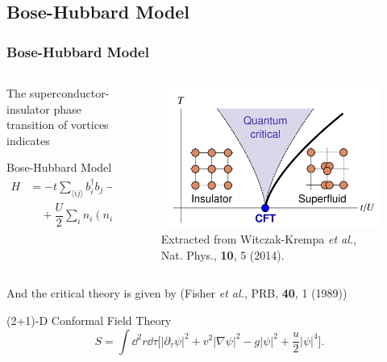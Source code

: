 \documentclass[10pt,aspectratio=43,xcolor=x11names,t]{beamer}%
\begin{document}
	\subsection{Bose-Hubbard Model}
		\begin{frame}\frametitle{Bose-Hubbard Model}
			\begin{columns}
				\begin{column}{0.45\textwidth}
					The superconductor-insulator phase transition of vortices indicates
					\begin{block}{Bose-Hubbard Model}
						\begin{align*}
							H&=-t\sum_{\langle ij \rangle}b_i^\dagger b_j-\mu\sum_i n_i\\
							&\quad+\dfrac{U}{2}\sum_i n_i(n_i-1)
						\end{align*}
					\end{block}
				\end{column}
				\begin{column}{0.5\textwidth}
					\begin{figure}[!htp]
						\includegraphics[scale=0.5]{Witczak.png}
						\caption{Extracted from {\scriptsize Witczak-Krempa \textit{et al.}, Nat. Phys., \textbf{10}, 5 (2014)}.}
					\end{figure}
				\end{column}
			\end{columns}
			\pause
			And the critical theory is given by ({\scriptsize Fisher \textit{et al.}, PRB, \textbf{40}, 1 (1989)})
			\begin{redblock}{(2+1)-D Conformal Field Theory}
				\begin{equation*}
					S=\int\dd^2r\dd\tau\bigg[|\partial_\tau\psi|^2+v^2|\nabla\psi|^2-g|\psi|^2+\dfrac{u}{2}|\psi|^4\bigg].
				\end{equation*}
			\end{redblock}
		\end{frame}
\end{document}
